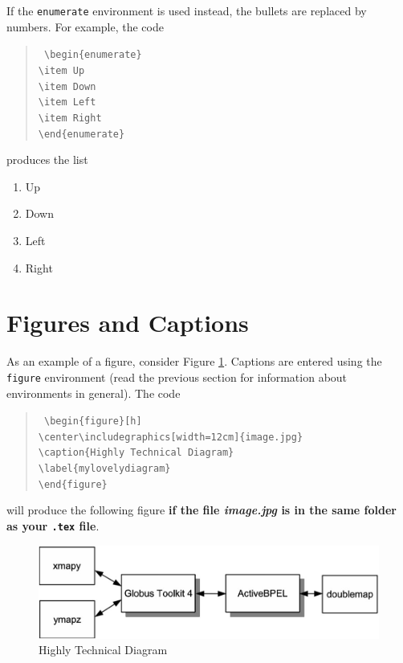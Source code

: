 \documentclass[11pt]{report}
\begin{document}
If the \texttt{enumerate} environment is used instead, the bullets are replaced by numbers. For example, the code
\begin{quote}\tt
	\textbackslash{}begin\{enumerate\} \\[-0.5em]
	\hspace*{2em}\textbackslash{}item Up \\[-0.5em]
	\hspace*{2em}\textbackslash{}item Down \\[-0.5em]
	\hspace*{2em}\textbackslash{}item Left \\[-0.5em]
	\hspace*{2em}\textbackslash{}item Right \\[-0.5em]
	\textbackslash{}end\{enumerate\}
\end{quote}
produces the list
\begin{enumerate} \item Up \item Down \item Left \item Right \end{enumerate}

\section{Figures and Captions}
As an example of a figure, consider Figure \ref{mylovelydiagram}. Captions are entered using the \texttt{figure} environment (read the previous section for information about environments in general). The code
\begin{quote}\tt
	\textbackslash{}begin\{figure\}[h] \\[-0.5em]
	\hspace*{2em}\textbackslash{}center\textbackslash{}includegraphics[width=12cm]\{image.jpg\} \\[-0.5em]
	\hspace*{2em}\textbackslash{}caption\{Highly Technical Diagram\} \\[-0.5em]
	\hspace*{2em}\textbackslash{}label\{mylovelydiagram\} \\[-0.5em]
	\textbackslash{}end\{figure\}
\end{quote}
will produce the following figure \textbf{if the file \textit{image.jpg} is in the same folder as your \texttt{.tex} file}.
\begin{figure}[h]
	\center\includegraphics[width=12cm]{image.jpg}
	\caption{Highly Technical Diagram}
	\label{mylovelydiagram}
\end{figure}
\end{document}
